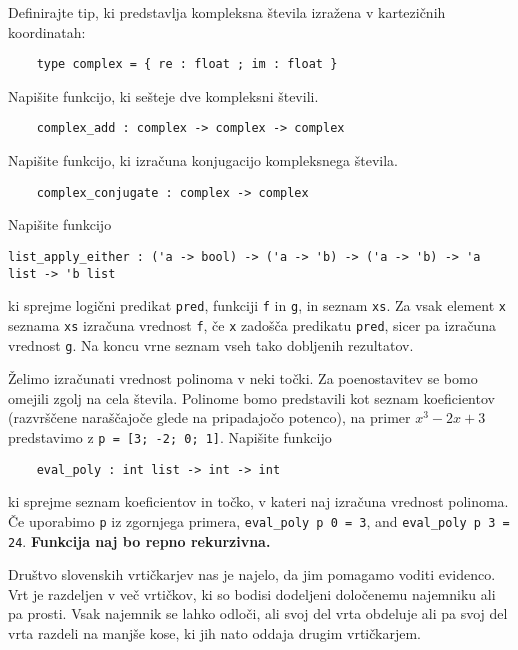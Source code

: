 \documentclass[arhiv]{../izpit}
\begin{document}

\naloga[]

Definirajte tip, ki predstavlja kompleksna števila izražena v kartezičnih koordinatah:
\begin{verbatim}
    type complex = { re : float ; im : float }
\end{verbatim}


\podnaloga
Napišite funkcijo, ki sešteje dve kompleksni števili.
\begin{verbatim}
    complex_add : complex -> complex -> complex
\end{verbatim}

\podnaloga
Napišite funkcijo, ki izračuna konjugacijo kompleksnega števila.
\begin{verbatim}
    complex_conjugate : complex -> complex
\end{verbatim}

\podnaloga
Napišite funkcijo
\begin{verbatim}
list_apply_either : ('a -> bool) -> ('a -> 'b) -> ('a -> 'b) -> 'a list -> 'b list
\end{verbatim}
ki sprejme logični predikat \verb|pred|, funkciji \verb|f| in \verb|g|, in seznam \verb|xs|. Za vsak element \verb|x| seznama \verb|xs| izračuna vrednost \verb|f|, če \verb|x| zadošča predikatu \verb|pred|, sicer pa izračuna vrednost \verb|g|. Na koncu vrne seznam vseh tako dobljenih rezultatov.

\podnaloga
Želimo izračunati vrednost polinoma v neki točki. Za poenostavitev se bomo omejili zgolj na cela števila. Polinome bomo predstavili kot seznam koeficientov (razvrščene naraščajoče glede na pripadajočo potenco), na primer $x^3 - 2x + 3$ predstavimo z \verb|p = [3; -2; 0; 1]|.
Napišite funkcijo
\begin{verbatim}
    eval_poly : int list -> int -> int
\end{verbatim}
ki sprejme seznam koeficientov in točko, v kateri naj izračuna vrednost polinoma. Če uporabimo \verb|p| iz zgornjega primera, \verb|eval_poly p 0 = 3|, and \verb|eval_poly p 3 = 24|. \textbf{Funkcija naj bo repno rekurzivna.}

\naloga

Društvo slovenskih vrtičkarjev nas je najelo, da jim pomagamo voditi evidenco. Vrt je razdeljen v več vrtičkov, ki so bodisi dodeljeni določenemu najemniku ali pa prosti. Vsak najemnik se lahko odloči, ali svoj del vrta obdeluje ali pa svoj del vrta razdeli na manjše kose, ki jih nato oddaja drugim vrtičkarjem.
\end{document}
